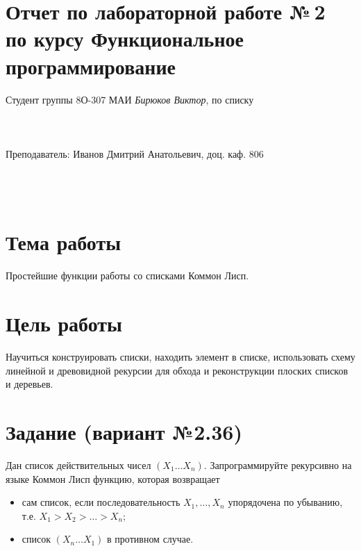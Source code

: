\documentclass[12pt]{article}
\begin{document}
\section*{Отчет по лабораторной работе №\,2 \\
по курсу \guillemotleft  Функциональное программирование\guillemotright}
\begin{flushright}
Студент группы 8О-307 МАИ \textit{Бирюков Виктор},  по списку \\
 \\
 \\
\ \\
Преподаватель: Иванов Дмитрий Анатольевич, доц. каф. 806 \\
 \\
 \\
 \\

\end{flushright}

\section{Тема работы}
Простейшие функции работы со списками Коммон Лисп.

\section{Цель работы}
Научиться конструировать списки, находить элемент в списке, использовать схему линейной и древовидной рекурсии для обхода и реконструкции плоских списков и деревьев.

\section{Задание (вариант №2.36)}
Дан список действительных чисел $(X_1 \ldots X_n)$.
Запрограммируйте рекурсивно на языке Коммон Лисп функцию, которая возвращает
\begin{itemize}
\setlength{\itemsep}{-1mm}
\item сам список, если последовательность $X_1, \ldots, X_n$ упорядочена по убыванию, т.е. $X_1 > X_2 > \ldots > X_n$;
\item список $(X_n \ldots X_1)$ в противном случае.
\end{itemize}
\end{document}
